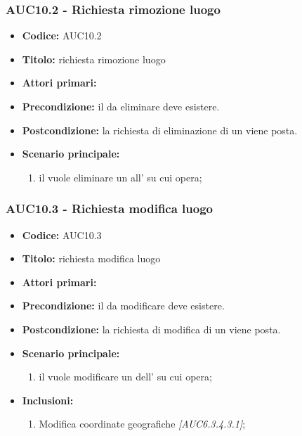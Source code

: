 \documentclass[casi-duso]{subfiles}
\begin{document}
\subsubsection{AUC10.2 - Richiesta rimozione luogo}%
\label{subsub:AUC10.2}
\begin{itemize}
  \item \textbf{Codice:} AUC10.2
  \item \textbf{Titolo:} richiesta rimozione luogo
  \item \textbf{Attori primari:} 
  \item \textbf{Precondizione:} il  da eliminare deve esistere.
  \item \textbf{Postcondizione:} la richiesta di eliminazione di un  viene posta.
  \item \textbf{Scenario principale:}
  \begin{enumerate}
    \item il  vuole eliminare un  all' su cui opera;
  \end{enumerate}
\end{itemize}

\subsubsection{AUC10.3 - Richiesta modifica luogo}%
\label{subsub:AUC10.3}
\begin{itemize}
  \item \textbf{Codice:} AUC10.3
  \item \textbf{Titolo:} richiesta modifica luogo
  \item \textbf{Attori primari:} 
  \item \textbf{Precondizione:} il  da modificare deve esistere.
  \item \textbf{Postcondizione:} la richiesta di modifica di un  viene posta.
  \item \textbf{Scenario principale:}
  \begin{enumerate}
    \item il  vuole modificare un  dell' su cui opera;
  \end{enumerate}
  \item \textbf{Inclusioni:}
  \begin{enumerate}
    \item Modifica coordinate geografiche \emph{[AUC6.3.4.3.1]};
  \end{enumerate}
\end{itemize}
\end{document}
